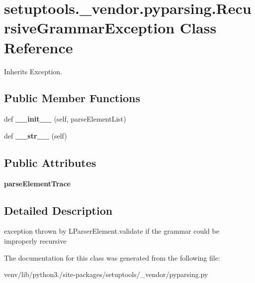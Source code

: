 \hypertarget{classsetuptools_1_1__vendor_1_1pyparsing_1_1_recursive_grammar_exception}{}\section{setuptools.\+\_\+vendor.\+pyparsing.\+Recursive\+Grammar\+Exception Class Reference}
\label{classsetuptools_1_1__vendor_1_1pyparsing_1_1_recursive_grammar_exception}


Inherits Exception.

\subsection*{Public Member Functions}
\begin{DoxyCompactItemize}
\item 
\mbox{\label{classsetuptools_1_1__vendor_1_1pyparsing_1_1_recursive_grammar_exception_a32e624155dc4c7301adfefe0cb224c16}} 
def {\bfseries \+\_\+\+\_\+init\+\_\+\+\_\+} (self, parse\+Element\+List)
\item 
\mbox{\label{classsetuptools_1_1__vendor_1_1pyparsing_1_1_recursive_grammar_exception_aa7ea07df25add4d6b768b6688ebfcc92}} 
def {\bfseries \+\_\+\+\_\+str\+\_\+\+\_\+} (self)
\end{DoxyCompactItemize}
\subsection*{Public Attributes}
\begin{DoxyCompactItemize}
\item 
\mbox{\label{classsetuptools_1_1__vendor_1_1pyparsing_1_1_recursive_grammar_exception_a854230101bb16ef67292585e35cd1010}} 
{\bfseries parse\+Element\+Trace}
\end{DoxyCompactItemize}


\subsection{Detailed Description}
\begin{DoxyVerb}exception thrown by L{ParserElement.validate} if the grammar could be improperly recursive\end{DoxyVerb}
 

The documentation for this class was generated from the following file\+:\begin{DoxyCompactItemize}
\item 
venv/lib/python3./site-\/packages/setuptools/\+\_\+vendor/pyparsing.\+py\end{DoxyCompactItemize}

